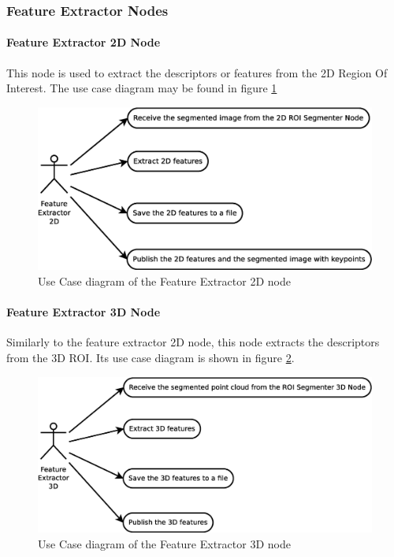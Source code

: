 \subsubsection{Feature Extractor Nodes}
\paragraph{Feature Extractor 2D Node \\[0.5cm]}
This node is used to extract the descriptors or features from the 2D Region Of Interest. 
The use case diagram may be found in figure \ref{uc_fe2d}
\begin{figure}[H]
\begin{center}
	\includegraphics[scale=0.4]{img/diagrams/uc_feature_extractor_2d.eps}
			\caption[Use case diagram Feature Extractor 2D node]{Use Case diagram of the Feature Extractor 2D node}
		\label{uc_fe2d}
\end{center}
\end{figure}


\paragraph{Feature Extractor 3D Node \\[0.5cm]}
Similarly to the feature extractor 2D node, this node extracts the descriptors from the 3D ROI. 
Its use case diagram is shown in figure \ref{uc_fe3d}.
\begin{figure}[H]
\begin{center}
	\includegraphics[scale=0.4]{img/diagrams/uc_feature_extractor_3d.eps}
			\caption[Use case diagram Feature Extractor 3D node]{Use Case diagram of the Feature Extractor 3D node}
		\label{uc_fe3d}
\end{center}
\end{figure}


